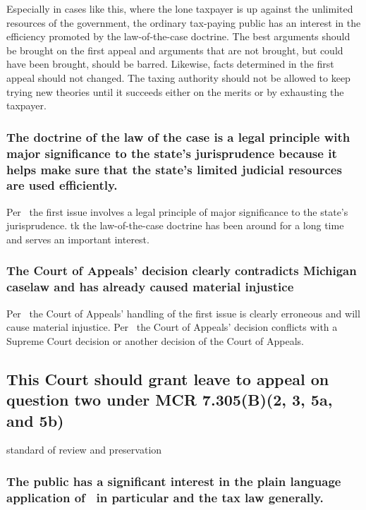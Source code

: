 \documentclass[12pt,\documentclassflag]{michiganCourtOfAppealsBrief}
\begin{document}
Especially in cases like this, where the lone taxpayer is up against the unlimited resources of the government, the ordinary tax-paying public has an interest in the efficiency promoted by the law-of-the-case doctrine. The best arguments should be brought on the first appeal and arguments that are not brought, but could have been brought, should be barred. Likewise, facts determined in the first appeal should not changed. The taxing authority should not be allowed to keep trying new theories until it succeeds either on the merits or by exhausting the taxpayer. 

\subsubsection{The doctrine of the law of the case is a legal principle with major significance to the state's jurisprudence because it helps make sure that the state's limited judicial resources are used efficiently.}

Per \cite{MCR 7.305(B)(3)}\ the first issue involves a legal principle of major significance to the state's jurisprudence. tk the law-of-the-case doctrine has been around for a long time and serves an important interest.

\subsubsection{The Court of Appeals' decision clearly contradicts Michigan caselaw and has already caused material injustice}

Per \cite{MCR 7.305(B)(5a)}\ the Court of Appeals' handling of the first issue is clearly erroneous and will cause material injustice.
Per \cite{MCR 7.305(B)(5b)}\ the Court of Appeals' decision conflicts with a Supreme Court decision or another decision of the Court of Appeals. 

\subsection{This Court should grant leave to appeal on question two under MCR 7.305(B)(2, 3, 5a, and 5b)}

standard of review and preservation

\subsubsection{The public has a significant interest in the plain language application of \mathieuGast\ in particular and the tax law generally.}
\end{document}
